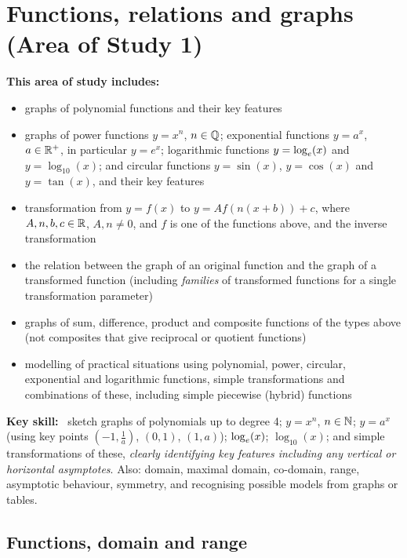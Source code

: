 \section{Functions, relations and graphs (Area of Study 1)}
\label{sec:functions}

\begin{sdbox}
\textbf{This area of study includes:}
\begin{itemize}
  \item graphs of polynomial functions and their key features
  \item graphs of power functions $y=x^n$, $n\in\mathbb{Q}$; exponential functions $y=a^x$, $a\in\mathbb{R}^+$, in particular $y=e^x$; logarithmic functions $y=\log_e(x)$ and $y=\log_{10}(x)$; and circular functions $y=\sin(x)$, $y=\cos(x)$ and $y=\tan(x)$, and their key features
  \item transformation from $y=f(x)$ to $y=Af(n(x+b))+c$, where $A,n,b,c\in\mathbb{R}$, $A,n\ne0$, and $f$ is one of the functions above, and the inverse transformation
  \item the relation between the graph of an original function and the graph of a transformed function (including \emph{families} of transformed functions for a single transformation parameter)
  \item graphs of sum, difference, product and composite functions of the types above (not composites that give reciprocal or quotient functions)
  \item modelling of practical situations using polynomial, power, circular, exponential and logarithmic functions, simple transformations and combinations of these, including simple piecewise (hybrid) functions
\end{itemize}
\textbf{Key skill:} \byhand\ sketch graphs of polynomials up to degree 4; $y=x^n$, $n\in\mathbb{N}$; $y=a^x$ (using key points $\left(-1,\frac1a\right)$, $(0,1)$, $(1,a)$); $\log_e(x)$; $\log_{10}(x)$; and simple transformations of these, \emph{clearly identifying key features including any vertical or horizontal asymptotes}. Also: domain, maximal domain, co-domain, range, asymptotic behaviour, symmetry, and recognising possible models from graphs or tables.
\end{sdbox}

\subsection{Functions, domain and range}
\label{sec:domain}

